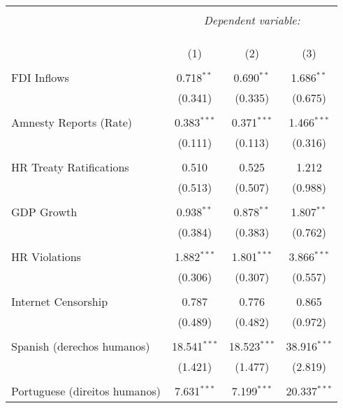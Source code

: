 
\begin{table}[!htbp] \centering 
  \caption{} 
  \label{} 
\begin{tabular}{@{\extracolsep{5pt}}lccc} 
\\[-1.8ex]\hline 
\hline \\[-1.8ex] 
 & \multicolumn{3}{c}{\textit{Dependent variable:}} \\ 
\cline{2-4} 
\\[-1.8ex] & \multicolumn{3}{c}{ } \\ 
\\[-1.8ex] & (1) & (2) & (3)\\ 
\hline \\[-1.8ex] 
 FDI Inflows & 0.718$^{**}$ & 0.690$^{**}$ & 1.686$^{**}$ \\ 
  & (0.341) & (0.335) & (0.675) \\ 
  & & & \\ 
 Amnesty Reports (Rate) & 0.383$^{***}$ & 0.371$^{***}$ & 1.466$^{***}$ \\ 
  & (0.111) & (0.113) & (0.316) \\ 
  & & & \\ 
 HR Treaty Ratifications & 0.510 & 0.525 & 1.212 \\ 
  & (0.513) & (0.507) & (0.988) \\ 
  & & & \\ 
 GDP Growth & 0.938$^{**}$ & 0.878$^{**}$ & 1.807$^{**}$ \\ 
  & (0.384) & (0.383) & (0.762) \\ 
  & & & \\ 
 HR Violations & 1.882$^{***}$ & 1.801$^{***}$ & 3.866$^{***}$ \\ 
  & (0.306) & (0.307) & (0.557) \\ 
  & & & \\ 
 Internet Censorship & 0.787 & 0.776 & 0.865 \\ 
  & (0.489) & (0.482) & (0.972) \\ 
  & & & \\ 
 Spanish (derechos humanos) & 18.541$^{***}$ & 18.523$^{***}$ & 38.916$^{***}$ \\ 
  & (1.421) & (1.477) & (2.819) \\ 
  & & & \\ 
 Portuguese (direitos humanos) & 7.631$^{***}$ & 7.199$^{***}$ & 20.337$^{***}$ \\ 

\end{tabular}
\end{table}
